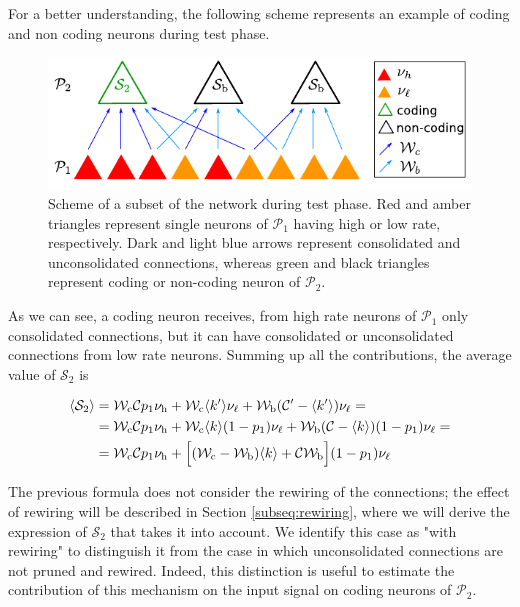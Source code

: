 \documentclass[a4paper, 12pt, twoside, openright]{book}
\newcommand{\popI}{\mathcal{P}_1}
\newcommand{\popII}{\mathcal{P}_2}
\newcommand{\rh}{\nu_\text{h}}
\newcommand{\rl}{\nu_{\ell}}
\newcommand{\C}{\mathcal{C}}
\newcommand{\Wb}{\mathcal{W}_\text{b}}
\newcommand{\Wc}{\mathcal{W}_\text{c}}
\newcommand{\SII}{\mathcal{S}_\text{2}}
\begin{document}
For a better understanding, the following scheme represents an example of coding and non coding neurons during test phase. 

\begin{figure}[H]
    \centering
    \includegraphics[width=\columnwidth]{figures/test_str_pl.pdf}
    \caption{Scheme of a subset of the network during test phase. Red and amber triangles represent single neurons of $\popI$ having high or low rate, respectively. Dark and light blue arrows represent consolidated and unconsolidated connections, whereas green and black triangles represent coding or non-coding neuron of $\popII$.}
    \label{fig:test_str_pl}
\end{figure}

As we can see, a coding neuron receives, from high rate neurons of $\popI$ only consolidated connections, but it can have consolidated or unconsolidated connections from low rate neurons. Summing up all the contributions, the average value of $\SII$ is

\begin{equation}
\label{eq:s2}
\begin{split}
    \langle \SII \rangle &= \Wc \C p_1 \rh + \Wc \langle k' \rangle \rl + \Wb (\C' - \langle k' \rangle) \rl =\\
    &= \Wc \C p_1 \rh + \Wc \langle k \rangle (1-p_1) \rl + \Wb (\C - \langle k \rangle) (1-p_1) \rl =\\
    &= \Wc \C p_1 \rh + \Bigl[ (\Wc - \Wb) \langle k \rangle + \C \Wb  \Bigr] (1-p_1)\rl
\end{split}
\end{equation}

The previous formula does not consider the rewiring of the connections; the effect of rewiring will be described in Section \ref{subseq:rewiring}, where we will derive the expression of $\SII$ that takes it into account.
We identify this case as "with rewiring" to distinguish it from the case in which unconsolidated connections are not pruned and rewired. Indeed, this distinction is useful to estimate the contribution of this mechanism on the input signal on coding neurons of $\popII$.
\end{document}
